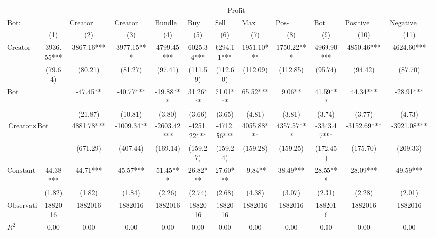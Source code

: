 \begin{tabular}{lccccccccccc}
\hline
 & \multicolumn{11}{c}{$\text{Profit}$} \\
 $\text{Bot}:$ &  & $\text{Creator Bundle Launch}$ & $\text{Creator Bundle Buy}$ & $\text{Bundle Launch}$ & $\text{Buy Bundle}$ & $\text{Sell Bundle}$ & $\text{Max Same Txn}$ & $\text{Pos-\#Swaps Ratio}$ & $\text{Bot Comment}$ & $\text{Positive Comment Bot}$ & $\text{Negative Comment Bot}$ \\
 & (1) & (2) & (3) & (4) & (5) & (6) & (7) & (8) & (9) & (10) & (11)\\
\hline
$\text{Creator}$ & 3936.55*** & 3867.16*** & 3977.15*** & 4799.45*** & 6025.34*** & 6294.11*** & 1951.10*** & 1750.22*** & 4969.90*** & 4850.46*** & 4624.60*** \\
 & (79.64) & (80.21) & (81.27) & (97.41) & (111.59) & (112.60) & (112.09) & (112.85) & (95.74) & (94.42) & (87.70) \\
$\text{Bot}$ &  & -47.45** & -40.77*** & -19.88*** & 31.26*** & 31.01*** & 65.52*** & 9.06** & 41.59*** & 44.34*** & -28.91*** \\
 &  & (21.87) & (10.81) & (3.80) & (3.66) & (3.65) & (4.81) & (3.81) & (3.74) & (3.77) & (4.73) \\
$\text{Creator} \times \text{Bot}$ &  & 4881.78*** & -1009.34** & -2603.42*** & -4251.22*** & -4712.56*** & 4055.88*** & 4357.57*** & -3343.47*** & -3152.69*** & -3921.08*** \\
 &  & (671.29) & (407.44) & (169.14) & (159.27) & (159.24) & (159.28) & (159.25) & (172.45) & (175.70) & (209.33) \\
$\text{Constant}$ & 44.38*** & 44.71*** & 45.57*** & 51.45*** & 26.82*** & 27.60*** & -9.84** & 38.49*** & 28.55*** & 28.09*** & 49.59*** \\
 & (1.82) & (1.82) & (1.84) & (2.26) & (2.74) & (2.68) & (4.38) & (3.07) & (2.31) & (2.28) & (2.01) \\
$\text{Observations}$ & 1882016 & 1882016 & 1882016 & 1882016 & 1882016 & 1882016 & 1882016 & 1882016 & 1882016 & 1882016 & 1882016 \\
$R^2$ & 0.00 & 0.00 & 0.00 & 0.00 & 0.00 & 0.00 & 0.00 & 0.00 & 0.00 & 0.00 & 0.00 \\
\hline
\end{tabular}